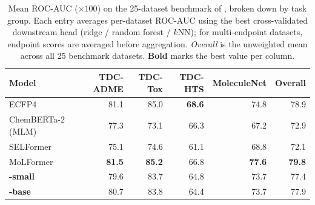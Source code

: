 \begin{table}[htbp]
  \centering
  \small
  \begin{tabularx}{\linewidth}{l r r r r r}
    \toprule
    \textbf{Model} & \textbf{TDC-ADME} & \textbf{TDC-Tox} & \textbf{TDC-HTS} & \textbf{MoleculeNet} & \textbf{Overall} \\
    \midrule
    ECFP4 & 81.1 & 85.0 & \textbf{68.6} & 74.8 & 78.9 \\
    ChemBERTa-2 (MLM) & 77.3 & 73.1 & 66.3 & 67.2 & 72.9 \\
    SELFormer & 75.1 & 74.6 & 61.1 & 68.8 & 72.1 \\
    MoLFormer & \textbf{81.5} & \textbf{85.2} & 66.8 & \textbf{77.6} & \textbf{79.8} \\
    \midrule
    \textbf{\model{}-small} & 79.6 & 83.7 & 64.8 & 73.7 & 77.4 \\
    \textbf{\model{}-base} & 80.7 & 83.8 & 64.4 & 73.7 & 77.9 \\
    \bottomrule
  \end{tabularx}
  \caption{%
    Mean ROC-AUC ($\times100$) on the 25-dataset benchmark of \citet{praskiBenchmarkingPretrainedMolecular2025}, broken down by
    task group. Each entry averages per-dataset ROC-AUC using the best cross-validated downstream head (ridge / random forest / $k$NN);
    for multi-endpoint datasets, endpoint scores are averaged before aggregation.
    \emph{Overall} is the unweighted mean across all 25 benchmark datasets.
    \textbf{Bold} marks the best value per column.
  }%
  \label{tab:main-results}
\end{table}
